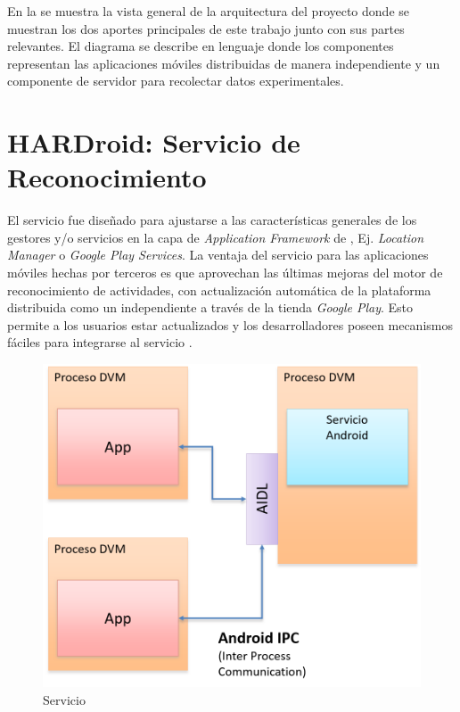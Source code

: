 En la  se muestra la vista general de
la arquitectura del proyecto donde se muestran los dos aportes principales
de este trabajo junto con sus partes relevantes. El diagrama se describe
en lenguaje  donde los componentes representan las aplicaciones
móviles distribuidas de manera independiente y un componente de servidor
para recolectar datos experimentales.

\section{HARDroid: Servicio de Reconocimiento}

\label{sec54:hardroid}El servicio  fue diseñado para
ajustarse a las características generales de los gestores y/o servicios
en la capa de \emph{Application Framework} de , Ej.
\emph{Location Manager} o \emph{Google Play Services}. La ventaja
del servicio  para las aplicaciones móviles hechas
por terceros es que aprovechan las últimas mejoras del motor de reconocimiento
de actividades, con actualización automática de la plataforma distribuida
como un  independiente a través de la tienda \emph{Google
Play}. Esto permite a los usuarios estar actualizados y los desarrolladores
poseen mecanismos fáciles para integrarse al servicio .

\begin{figure}[H]
\begin{centering}
\includegraphics[width=0.8\columnwidth]{capitulo-5/graphics/hardroid_func}
\par\end{centering}
\caption[Servicio HARDroid]{\label{fig5:hardroid-func}Servicio }

\end{figure}

